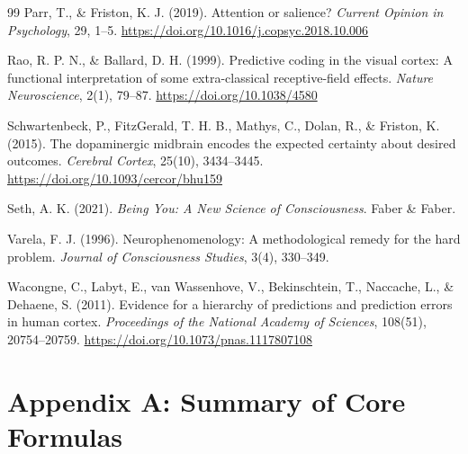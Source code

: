 \documentclass[11pt,a4paper]{article}
\begin{document}
\begin{thebibliography}{99}
Parr, T., \& Friston, K. J. (2019).
Attention or salience?
\textit{Current Opinion in Psychology}, 29, 1--5.
\url{https://doi.org/10.1016/j.copsyc.2018.10.006}

Rao, R. P. N., \& Ballard, D. H. (1999).
Predictive coding in the visual cortex: A functional interpretation of some extra-classical receptive-field effects.
\textit{Nature Neuroscience}, 2(1), 79--87.
\url{https://doi.org/10.1038/4580}

Schwartenbeck, P., FitzGerald, T. H. B., Mathys, C., Dolan, R., \& Friston, K. (2015).
The dopaminergic midbrain encodes the expected certainty about desired outcomes.
\textit{Cerebral Cortex}, 25(10), 3434--3445.
\url{https://doi.org/10.1093/cercor/bhu159}

Seth, A. K. (2021).
\textit{Being You: A New Science of Consciousness}.
Faber \& Faber.

Varela, F. J. (1996).
Neurophenomenology: A methodological remedy for the hard problem.
\textit{Journal of Consciousness Studies}, 3(4), 330--349.

Wacongne, C., Labyt, E., van Wassenhove, V., Bekinschtein, T., Naccache, L., \& Dehaene, S. (2011).
Evidence for a hierarchy of predictions and prediction errors in human cortex.
\textit{Proceedings of the National Academy of Sciences}, 108(51), 20754--20759.
\url{https://doi.org/10.1073/pnas.1117807108}

\end{thebibliography}

\newpage
\section*{Appendix A: Summary of Core Formulas}
\end{document}
